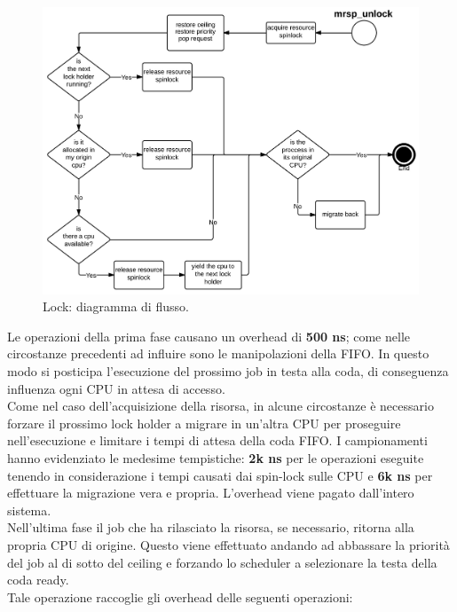 \begin{figure}
\includegraphics[width=\linewidth]{images/mrsp_unlock.jpeg}
\caption{Lock: diagramma di flusso.}
\label{fig:mrsplock}
\end{figure}

\noindent Le operazioni della prima fase causano un overhead di \textbf{500 ns}; come nelle circostanze precedenti ad influire sono le manipolazioni della FIFO. In questo modo si posticipa l'esecuzione del prossimo job in testa alla coda, di conseguenza influenza ogni CPU in attesa di accesso.\\

\noindent Come nel caso dell'acquisizione della risorsa, in alcune circostanze è necessario forzare il prossimo lock holder a migrare in un'altra CPU per proseguire nell'esecuzione e limitare i tempi di attesa della coda FIFO. I campionamenti hanno evidenziato le medesime tempistiche: \textbf{2k ns} per le operazioni eseguite tenendo in considerazione i tempi causati dai spin-lock sulle CPU e \textbf{6k ns} per effettuare la migrazione vera e propria. L'overhead viene pagato dall'intero sistema.\\

\noindent Nell'ultima fase il job che ha rilasciato la risorsa, se necessario, ritorna alla propria CPU di origine. Questo viene effettuato andando ad abbassare la priorità del job al di sotto del ceiling e forzando lo scheduler a selezionare la testa della coda ready.\\

\noindent Tale operazione raccoglie gli overhead delle seguenti operazioni:


